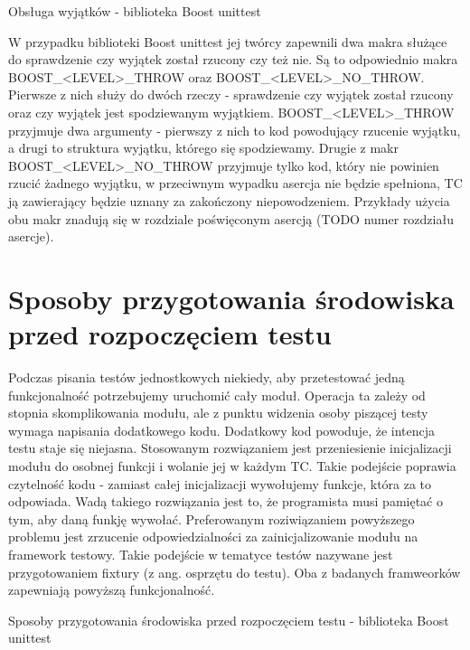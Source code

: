 \documentclass[12pt,a4paper,notitlepage]{report}
\begin{document}
Obsługa wyjątków - biblioteka Boost unittest

W przypadku biblioteki Boost unittest jej twórcy zapewnili dwa makra służące do sprawdzenie czy wyjątek został rzucony czy też nie. Są to odpowiednio makra BOOST_<LEVEL>_THROW oraz BOOST_<LEVEL>_NO_THROW. Pierwsze z nich służy do dwóch rzeczy - sprawdzenie czy wyjątek został rzucony oraz czy wyjątek jest spodziewanym wyjątkiem. BOOST_<LEVEL>_THROW przyjmuje dwa argumenty - pierwszy z nich to kod powodujący rzucenie wyjątku, a drugi to struktura wyjątku, którego się spodziewamy. 
Drugie z makr BOOST_<LEVEL>_NO_THROW przyjmuje tylko kod, który nie powinien rzucić żadnego wyjątku, w przeciwnym wypadku asercja nie będzie spełniona, TC ją zawierający będzie uznany za zakończony niepowodzeniem.
Przykłady użycia obu makr znadują się w rozdziale poświęconym asercją (TODO numer rozdziału asercje).

\chapter{Sposoby przygotowania środowiska przed rozpoczęciem testu}

Podczas pisania testów jednostkowych niekiedy, aby przetestować jedną funkcjonalność potrzebujemy uruchomić cały moduł. Operacja ta zależy od stopnia skomplikowania modułu, ale z punktu widzenia osoby piszącej testy wymaga napisania dodatkowego kodu. Dodatkowy kod powoduje, że intencja testu staje się niejasna. 
Stosowanym rozwiązaniem jest przeniesienie inicjalizacji modułu do osobnej funkcji i wolanie jej w każdym TC. Takie podejście poprawia czytelność kodu - zamiast całej inicjalizacji wywołujemy funkcje, która za to odpowiada. Wadą takiego rozwiązania jest to, że programista musi pamiętać o tym, aby daną funkję wywołać.
Preferowanym roziwiązaniem powyższego problemu jest zrzucenie odpowiedzialności za zainicjalizowanie modułu na framework testowy. Takie podejście w tematyce testów nazywane jest przygotowaniem fixtury (z ang. osprzętu do testu).
Oba z badanych framweorków zapewniają powyższą funkcjonalność.

Sposoby przygotowania środowiska przed rozpoczęciem testu - biblioteka Boost unittest
\end{document}

